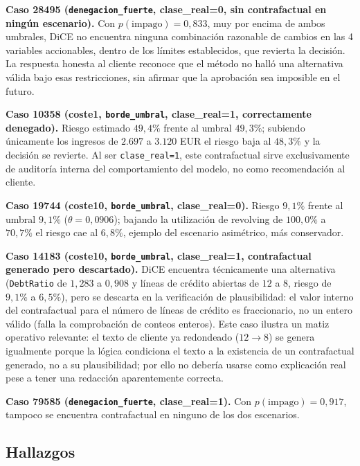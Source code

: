 \documentclass[11pt,a4paper]{article}
\begin{document}
\textbf{Caso 28495 (\texttt{denegacion\_fuerte}, clase\_real=0, sin contrafactual en ningún escenario).} Con $p(\text{impago})=0{,}833$, muy por encima de ambos umbrales, DiCE no encuentra ninguna combinación razonable de cambios en las 4 variables accionables, dentro de los límites establecidos, que revierta la decisión. La respuesta honesta al cliente reconoce que el método no halló una alternativa válida bajo esas restricciones, sin afirmar que la aprobación sea imposible en el futuro.

\textbf{Caso 10358 (coste1, \texttt{borde\_umbral}, clase\_real=1, correctamente denegado).} Riesgo estimado $49{,}4\%$ frente al umbral $49{,}3\%$; subiendo únicamente los ingresos de $2{.}697$ a $3{.}120$ EUR el riesgo baja al $48{,}3\%$ y la decisión se revierte. Al ser \texttt{clase\_real=1}, este contrafactual sirve exclusivamente de auditoría interna del comportamiento del modelo, no como recomendación al cliente.

\textbf{Caso 19744 (coste10, \texttt{borde\_umbral}, clase\_real=0).} Riesgo $9{,}1\%$ frente al umbral $9{,}1\%$ ($\theta=0{,}0906$); bajando la utilización de revolving de $100{,}0\%$ a $70{,}7\%$ el riesgo cae al $6{,}8\%$, ejemplo del escenario asimétrico, más conservador.

\textbf{Caso 14183 (coste10, \texttt{borde\_umbral}, clase\_real=1, contrafactual generado pero descartado).} DiCE encuentra técnicamente una alternativa (\texttt{DebtRatio} de $1{,}283$ a $0{,}908$ y líneas de crédito abiertas de $12$ a $8$, riesgo de $9{,}1\%$ a $6{,}5\%$), pero se descarta en la verificación de plausibilidad: el valor interno del contrafactual para el número de líneas de crédito es fraccionario, no un entero válido (falla la comprobación de conteos enteros). Este caso ilustra un matiz operativo relevante: el texto de cliente ya redondeado ($12\rightarrow 8$) se genera igualmente porque la lógica condiciona el texto a la existencia de un contrafactual generado, no a su plausibilidad; por ello no debería usarse como explicación real pese a tener una redacción aparentemente correcta.

\textbf{Caso 79585 (\texttt{denegacion\_fuerte}, clase\_real=1).} Con $p(\text{impago})=0{,}917$, tampoco se encuentra contrafactual en ninguno de los dos escenarios.

\subsection{Hallazgos}
\end{document}
